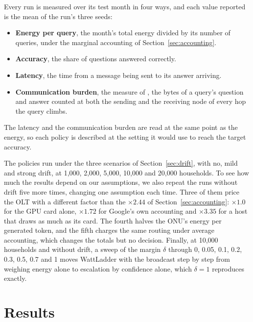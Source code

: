 \documentclass[cic,dipl,english]{infufrgs}
\begin{document}
Every run is measured over its test month in four ways, and each value reported is the mean of
the run's three seeds:

\begin{itemize}
  \item \textbf{Energy per query}, the month's total energy divided by its number of queries,
  under the marginal accounting of Section~\ref{sec:accounting}.
  \item \textbf{Accuracy}, the share of questions answered correctly.
  \item \textbf{Latency}, the time from a message being sent to its answer arriving.
  \item \textbf{Communication burden}, the measure of , the bytes
  of a query's question and answer counted at both the sending and the receiving node of
  every hop the query climbs.
\end{itemize}

The latency and the communication burden are read at the same point as the energy, so each
policy is described at the setting it would use to reach the target accuracy.

The policies run under the three scenarios of Section~\ref{sec:drift}, with no, mild and
strong drift, at 1,000, 2,000, 5,000, 10,000 and 20,000 households. To see how much the
results depend on our assumptions, we also repeat the runs without drift five more times,
changing one assumption each time. Three of them price the OLT with a different factor than
the $\times 2.44$ of Section~\ref{sec:accounting}: $\times 1.0$ for the GPU card alone,
$\times 1.72$ for Google's own accounting and $\times 3.35$ for a host that draws as much as its
card. The fourth halves the ONU's energy per generated token, and the fifth charges the same routing under
average accounting, which changes the totals but no decision. Finally, at 10,000 households and without drift, a sweep of the margin $\delta$ through 0, 0.05,
0.1, 0.2, 0.3, 0.5, 0.7 and 1 moves WattLadder with the broadcast step by step from weighing
energy alone to escalation by confidence alone, which $\delta = 1$ reproduces exactly.

\chapter{Results}
\label{chap:results}
\end{document}
